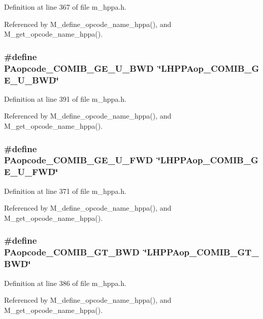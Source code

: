 Definition at line 367 of file m\_\-hppa.h.

Referenced by M\_\-define\_\-opcode\_\-name\_\-hppa(), and M\_\-get\_\-opcode\_\-name\_\-hppa().
\subsubsection{\setlength{\rightskip}{0pt plus 5cm}\#define PAopcode\_\-COMIB\_\-GE\_\-U\_\-BWD~\char`\"{}LHPPAop\_\-COMIB\_\-GE\_\-U\_\-BWD\char`\"{}}\label{m__hppa_8h_8d2ab12dcecdc394851b48b617d5dca2}




Definition at line 391 of file m\_\-hppa.h.

Referenced by M\_\-define\_\-opcode\_\-name\_\-hppa(), and M\_\-get\_\-opcode\_\-name\_\-hppa().
\subsubsection{\setlength{\rightskip}{0pt plus 5cm}\#define PAopcode\_\-COMIB\_\-GE\_\-U\_\-FWD~\char`\"{}LHPPAop\_\-COMIB\_\-GE\_\-U\_\-FWD\char`\"{}}\label{m__hppa_8h_ad2a69b23fac7ddc4916b52754b4ea48}




Definition at line 371 of file m\_\-hppa.h.

Referenced by M\_\-define\_\-opcode\_\-name\_\-hppa(), and M\_\-get\_\-opcode\_\-name\_\-hppa().
\subsubsection{\setlength{\rightskip}{0pt plus 5cm}\#define PAopcode\_\-COMIB\_\-GT\_\-BWD~\char`\"{}LHPPAop\_\-COMIB\_\-GT\_\-BWD\char`\"{}}\label{m__hppa_8h_dbdc690688b1cdb4b664f388c9925d60}




Definition at line 386 of file m\_\-hppa.h.

Referenced by M\_\-define\_\-opcode\_\-name\_\-hppa(), and M\_\-get\_\-opcode\_\-name\_\-hppa().
